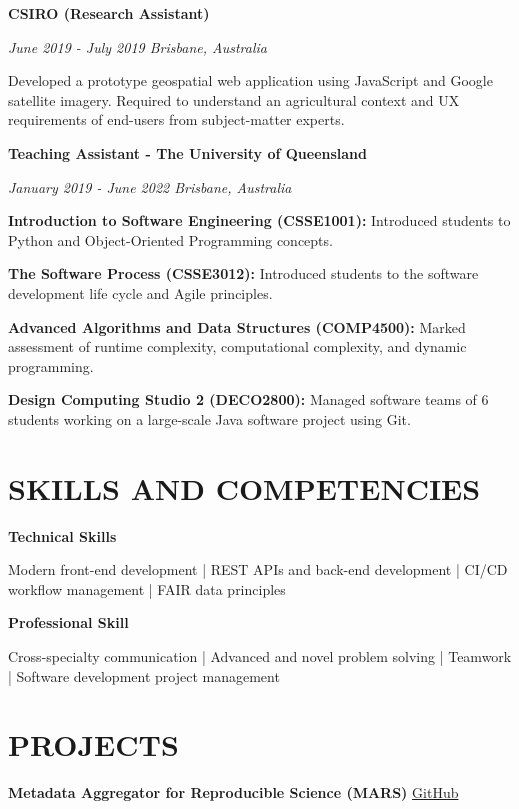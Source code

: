 \documentclass{article}
\begin{document}
  {\large\textbf{CSIRO (Research Assistant)}}

  \textit{June 2019 - July 2019 \hfill Brisbane, Australia}

  Developed a prototype geospatial web application using JavaScript and Google satellite imagery. Required to understand an agricultural context and UX requirements of end-users from subject-matter experts.

  \pagebreak

  {\large\textbf{Teaching Assistant - The University of Queensland}}

  \textit{January 2019 - June 2022 \hfill Brisbane, Australia}

  \textbf{Introduction to Software Engineering (CSSE1001):} Introduced students to Python and Object-Oriented Programming concepts.

  \textbf{The Software Process (CSSE3012):} Introduced students to the software development life cycle and Agile principles.

  \textbf{Advanced Algorithms and Data Structures (COMP4500):} Marked assessment of runtime complexity, computational complexity, and dynamic programming.

  \textbf{Design Computing Studio 2 (DECO2800):} Managed software teams of 6 students working on a large-scale Java software project using Git.

  \section*{\centering\uppercase{Skills and Competencies}}

  {\large\textbf{Technical Skills}}

  Modern front-end development | REST APIs and back-end development | CI/CD workflow management | FAIR data principles

  \medbreak

  {\large\textbf{Professional Skill}}

  Cross-specialty communication | Advanced and novel problem solving | Teamwork | Software development project management

  \section*{\centering\uppercase{Projects}}
  
  \textbf{Metadata Aggregator for Reproducible Science (MARS)} \hfill \href{https://github.com/Brain-Development-and-Disorders-Lab/mars}{\color{blue}GitHub}
\end{document}
